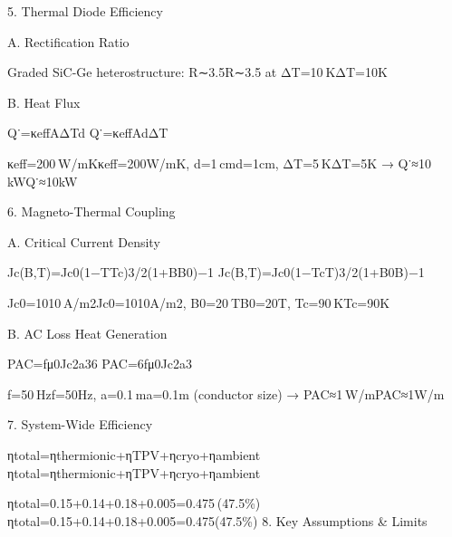 \documentclass{article}
\begin{document}
5. Thermal Diode Efficiency

A. Rectification Ratio

Graded SiC-Ge heterostructure: R∼3.5R∼3.5 at ΔT=10 KΔT=10K

B. Heat Flux

Q˙=κeffAΔTd Q˙\hspace{0pt}=κeff\hspace{0pt}AdΔT\hspace{0pt}

κeff=200 W/mKκeff\hspace{0pt}=200W/mK, d=1 cmd=1cm, ΔT=5 KΔT=5K →
Q˙≈10 kWQ˙\hspace{0pt}≈10kW

6. Magneto-Thermal Coupling

A. Critical Current Density

Jc(B,T)=Jc0(1−TTc)3/2(1+BB0)−1
Jc\hspace{0pt}(B,T)=Jc0\hspace{0pt}(1−Tc\hspace{0pt}T\hspace{0pt})3/2(1+B0\hspace{0pt}B\hspace{0pt})−1

Jc0=1010 A/m2Jc0\hspace{0pt}=1010A/m2, B0=20 TB0\hspace{0pt}=20T,
Tc=90 KTc\hspace{0pt}=90K

B. AC Loss Heat Generation

PAC=fμ0Jc2a36
PAC\hspace{0pt}=6fμ0\hspace{0pt}Jc2\hspace{0pt}a3\hspace{0pt}

f=50 Hzf=50Hz, a=0.1 ma=0.1m (conductor size) →
PAC≈1 W/mPAC\hspace{0pt}≈1W/m

7. System-Wide Efficiency

ηtotal=ηthermionic+ηTPV+ηcryo+ηambient
ηtotal\hspace{0pt}=ηthermionic\hspace{0pt}+ηTPV\hspace{0pt}+ηcryo\hspace{0pt}+ηambient\hspace{0pt}

ηtotal=0.15+0.14+0.18+0.005=0.475 (47.5\%)
ηtotal\hspace{0pt}=0.15+0.14+0.18+0.005=0.475(47.5\%) 8. Key Assumptions
\& Limits
\end{document}
